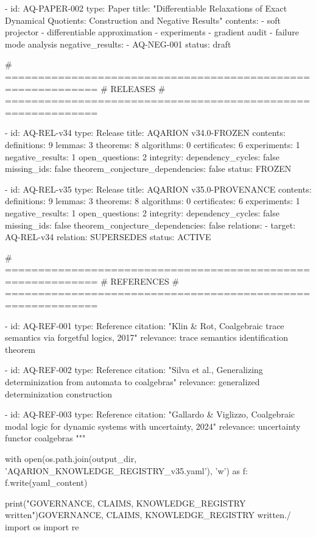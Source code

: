   - id: AQ-PAPER-002
    type: Paper
    title: "Differentiable Relaxations of Exact Dynamical Quotients: Construction and Negative Results"
    contents:
      - soft projector
      - differentiable approximation
      - experiments
      - gradient audit
      - failure mode analysis
    negative_results:
      - AQ-NEG-001
    status: draft

  # ============================================================
  # RELEASES
  # ============================================================

  - id: AQ-REL-v34
    type: Release
    title: AQARION v34.0-FROZEN
    contents:
      definitions: 9
      lemmas: 3
      theorems: 8
      algorithms: 0
      certificates: 6
      experiments: 1
      negative_results: 1
      open_questions: 2
    integrity:
      dependency_cycles: false
      missing_ids: false
      theorem_conjecture_dependencies: false
    status: FROZEN

  - id: AQ-REL-v35
    type: Release
    title: AQARION v35.0-PROVENANCE
    contents:
      definitions: 9
      lemmas: 3
      theorems: 8
      algorithms: 0
      certificates: 6
      experiments: 1
      negative_results: 1
      open_questions: 2
    integrity:
      dependency_cycles: false
      missing_ids: false
      theorem_conjecture_dependencies: false
    relations:
      - target: AQ-REL-v34
        relation: SUPERSEDES
    status: ACTIVE

  # ============================================================
  # REFERENCES
  # ============================================================

  - id: AQ-REF-001
    type: Reference
    citation: "Klin & Rot, Coalgebraic trace semantics via forgetful logics, 2017"
    relevance: trace semantics identification theorem

  - id: AQ-REF-002
    type: Reference
    citation: "Silva et al., Generalizing determinization from automata to coalgebras"
    relevance: generalized determinization construction

  - id: AQ-REF-003
    type: Reference
    citation: "Gallardo & Viglizzo, Coalgebraic modal logic for dynamic systems with uncertainty, 2024"
    relevance: uncertainty functor coalgebras
"""

with open(os.path.join(output_dir, 'AQARION_KNOWLEDGE_REGISTRY_v35.yaml'), 'w') as f:
    f.write(yaml_content)

print("GOVERNANCE, CLAIMS, KNOWLEDGE_REGISTRY written")GOVERNANCE, CLAIMS, KNOWLEDGE_REGISTRY written./
import os
import re

